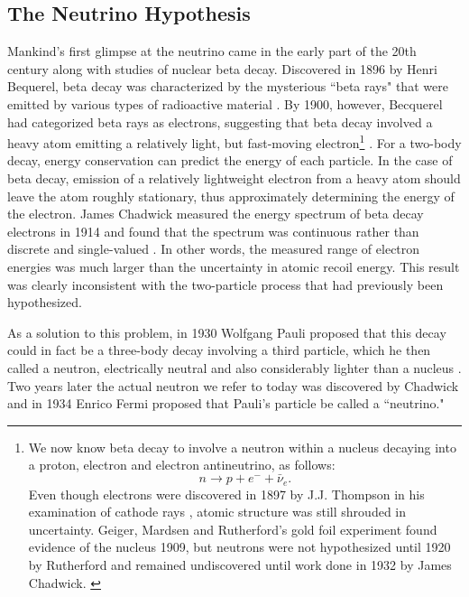\subsection{The Neutrino Hypothesis}

Mankind's first glimpse at the neutrino came in the early part of the 20th
century along with studies of nuclear beta decay.  Discovered in 1896 by Henri
Bequerel, beta decay was characterized by the mysterious ``beta rays" that were
emitted by various types of radioactive material \cite{becquerelBeta}.  By
1900, however, Becquerel had categorized beta rays as electrons, suggesting
that beta decay involved a heavy atom emitting a relatively light, but
fast-moving electron\footnote{
We now know beta decay to involve a neutron within a nucleus decaying into a
proton, electron and electron antineutrino, as follows:
\begin{equation*}      n \rightarrow p + e^- + \bar{\nu}_e  . \end{equation*}
Even though electrons were discovered in 1897 by J.J. Thompson in his
examination of cathode rays \cite{thompson}, atomic structure was still
shrouded in uncertainty.  Geiger, Mardsen and Rutherford's gold foil experiment
found evidence of the nucleus 1909, but neutrons were not hypothesized until
1920 by Rutherford \cite{rutherfordNeutron} and remained undiscovered until
work done in 1932 by James Chadwick. \cite{chadwickNeutron}
 } \cite{becquerelElec}.
For a two-body decay, energy conservation can predict the energy of
each particle.
In the case of beta decay, emission of a relatively lightweight electron from
a heavy atom should leave the atom roughly stationary,
thus approximately determining the energy of the electron.
James Chadwick measured the energy spectrum of beta decay electrons in 1914 and
found that the spectrum was continuous rather than discrete and single-valued
\cite {chadwickBeta}.  In other words, the measured range of electron energies
was much larger than the uncertainty in atomic recoil energy.
This result was clearly inconsistent with the two-particle process that had
previously been hypothesized.

As a solution to this problem, in 1930 Wolfgang Pauli proposed that this decay
could in fact be a three-body decay involving a third particle, which he then
called a neutron, electrically neutral and also considerably lighter than a
nucleus \cite{pauliNeuProp}.  Two years later the actual neutron we refer to
today was discovered by Chadwick \cite{chadwickNeutron} and in 1934 Enrico
Fermi proposed that Pauli's particle be called a ``neutrino."
\cite{fermiNeuName}

